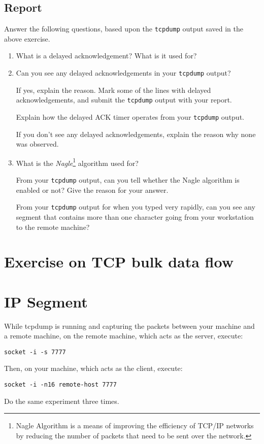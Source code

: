 \documentclass{../UTNetLab}
\begin{document}
    \subsection*{Report}
    Answer the following questions, based upon the \lstinline{tcpdump} output saved in the above exercise.
    \begin{enumerate}
        \item What is a delayed acknowledgement?
        What is it used for?
        
        \item Can you see any delayed acknowledgements in your \lstinline{tcpdump} output?

        If yes, explain the reason.
        Mark some of the lines with delayed acknowledgements, and submit the \lstinline{tcpdump} output with your report.

        Explain how the delayed ACK timer operates from your \lstinline{tcpdump} output.

        If you don’t see any delayed acknowledgements, explain the reason why none was observed.
        
        \item What is the \textit{Nagle}\footnote{Nagle Algorithm is a means of improving the efficiency of TCP/IP networks by reducing the number of packets that need to be sent over the network.} algorithm used for?

        From your \lstinline{tcpdump} output, can you tell whether the Nagle algorithm is enabled or not? Give the reason for your answer.

        From your \lstinline{tcpdump} output for when you typed very rapidly, can you see any segment that contains more than one character going from your workstation to the remote machine?
    \end{enumerate}

\section*{Exercise on TCP bulk data flow}
\section{IP Segment}
    While tcpdump is running and capturing the packets between your machine and a remote machine, on the remote machine, which acts as the server, execute:
    \begin{lstlisting}
socket -i -s 7777
    \end{lstlisting}
    Then, on your machine, which acts as the client, execute:
    \begin{lstlisting}[emph={your-host, remote-host}]
socket -i -n16 remote-host 7777
    \end{lstlisting}
    Do the same experiment three times.
\end{document}
